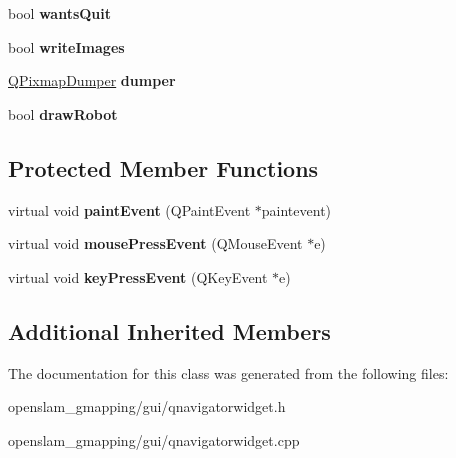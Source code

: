 \begin{DoxyCompactItemize}
\item 
\mbox{\label{classQNavigatorWidget_a0dd9109cac81aef603bbf6eed1a81ccf}} 
bool {\bfseries wants\+Quit}
\item 
\mbox{\label{classQNavigatorWidget_ac817e34c2df4a20b9c345bc9e62a5086}} 
bool {\bfseries write\+Images}
\item 
\mbox{\label{classQNavigatorWidget_a870438ac8610e4a82d3d3d625d5f817f}} 
\hyperlink{structQPixmapDumper}{Q\+Pixmap\+Dumper} {\bfseries dumper}
\item 
\mbox{\label{classQNavigatorWidget_a0ac13b5c2e86b6f895d7eb4e391ee7d4}} 
bool {\bfseries draw\+Robot}
\end{DoxyCompactItemize}
\subsection*{Protected Member Functions}
\begin{DoxyCompactItemize}
\item 
\mbox{\label{classQNavigatorWidget_a73249bf3fc0313e7db9dd2f0b3d75c7c}} 
virtual void {\bfseries paint\+Event} (Q\+Paint\+Event $\ast$paintevent)
\item 
\mbox{\label{classQNavigatorWidget_aeeedc5802eef4095ec6d7c014a19bf4a}} 
virtual void {\bfseries mouse\+Press\+Event} (Q\+Mouse\+Event $\ast$e)
\item 
\mbox{\label{classQNavigatorWidget_a74e6c59031981888d792b595bbddd4d9}} 
virtual void {\bfseries key\+Press\+Event} (Q\+Key\+Event $\ast$e)
\end{DoxyCompactItemize}
\subsection*{Additional Inherited Members}


The documentation for this class was generated from the following files\+:\begin{DoxyCompactItemize}
\item 
openslam\+\_\+gmapping/gui/qnavigatorwidget.\+h\item 
openslam\+\_\+gmapping/gui/qnavigatorwidget.\+cpp\end{DoxyCompactItemize}
